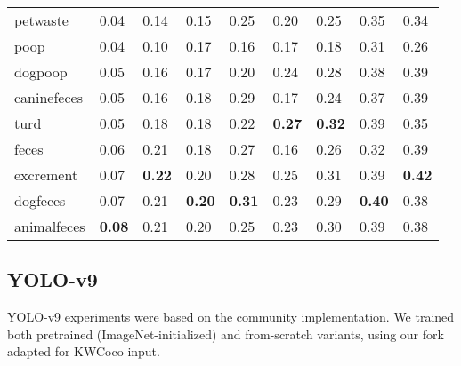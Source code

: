 \begin{table*}[t]
\begin{tabular}{lllllllll}
 petwaste    & 0.04                 & 0.14                  & 0.15                 & 0.25                  & 0.20                 & 0.25                  & 0.35                 & 0.34                  \\
 poop        & 0.04                 & 0.10                  & 0.17                 & 0.16                  & 0.17                 & 0.18                  & 0.31                 & 0.26                  \\
 dogpoop     & 0.05                 & 0.16                  & 0.17                 & 0.20                  & 0.24                 & 0.28                  & 0.38                 & 0.39                  \\
 caninefeces & 0.05                 & 0.16                  & 0.18                 & 0.29                  & 0.17                 & 0.24                  & 0.37                 & 0.39                  \\
 turd        & 0.05                 & 0.18                  & 0.18                 & 0.22                  & \textbf{0.27}        & \textbf{0.32}         & 0.39                 & 0.35                  \\
 feces       & 0.06                 & 0.21                  & 0.18                 & 0.27                  & 0.16                 & 0.26                  & 0.32                 & 0.39                  \\
 excrement   & 0.07                 & \textbf{0.22}         & 0.20                 & 0.28                  & 0.25                 & 0.31                  & 0.39                 & \textbf{0.42}         \\
 dogfeces    & 0.07                 & 0.21                  & \textbf{0.20}        & \textbf{0.31}         & 0.23                 & 0.29                  & \textbf{0.40}        & 0.38                  \\
 animalfeces & \textbf{0.08}        & 0.21                  & 0.20                 & 0.25                  & 0.23                 & 0.30                  & 0.39                 & 0.38                  \\
\bottomrule
\end{tabular}
\end{table*}


\subsection{YOLO-v9}

YOLO-v9 experiments were based on the community  implementation.
We trained both pretrained (ImageNet-initialized) and from-scratch variants, using our fork adapted for
  KWCoco input.

